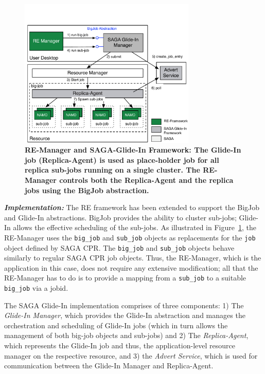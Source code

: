 \documentclass{rspublic}
\newcommand{\replicaagent}[1]{Replica-Agent }
\newcommand{\remanager}[1]{RE-Manager }
\begin{document}
\begin{figure}[t]
	    \begin{center}  
	      \includegraphics[width=0.75\textwidth]{re_bigjob_interactions_v2}
	      \caption{\footnotesize \bf RE-Manager and SAGA-Glide-In Framework:
	        The Glide-In job (Replica-Agent) is used as place-holder job
	        for all replica sub-jobs running on a single cluster. The
	        \remanager\ controls both the \replicaagent\ and the replica
	        jobs using the BigJob abstraction.\vspace*{-1em}}
	        \label{fig:remdmanager_v1.1}   
	    \end{center}
\end{figure}

{\noindent \it \bf Implementation:} The RE framework has been
extended to support the BigJob and Glide-In abstractions.
BigJob provides the ability to cluster sub-jobs; Glide-In allows the
effective scheduling of the sub-jobs.  As illustrated in
Figure~\ref{fig:remdmanager_v1.1}, the RE-Manager uses the
\texttt{big\_job} and \texttt{sub\_job} objects as replacements for the
\texttt{job} object defined by SAGA CPR.  The \texttt{big\_job} and
\texttt{sub\_job} objects behave similarly to regular SAGA CPR job
objects. Thus, the RE-Manager, which is the application in this case,
does not require any extensive modification; 
all that the RE-Manager has to do is to provide a mapping 
from a \texttt{sub\_job} to a suitable \texttt{big\_job} via a jobid.

The SAGA Glide-In implementation comprises of three components: 1) The
\emph{Glide-In Manager}, which provides the Glide-In abstraction and
manages the orchestration and scheduling 
of Glide-In jobs (which in turn allows
the management of both big-job objects and sub-jobs) and 2) The
\emph{Replica-Agent}, which represents the Glide-In job and thus, the
application-level resource manager on the respective resource, and 3)
the \emph{Advert Service}, which is used for communication between the
Glide-In Manager and Replica-Agent.
\end{document}
